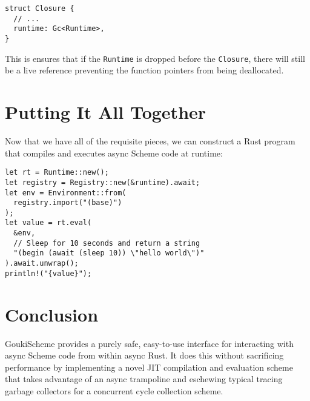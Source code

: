 \documentclass[sigplan,authordraft]{acmart}
\begin{document}
\begin{verbatim}
struct Closure {
  // ...
  runtime: Gc<Runtime>,
}
\end{verbatim}

This is ensures that if the \texttt{Runtime} is dropped before the
\texttt{Closure}, there will still be a live reference preventing the function
pointers from being deallocated.

\section{Putting It All Together}

Now that we have all of the requisite pieces, we can construct a Rust program
that compiles and executes async Scheme code at runtime:

\begin{verbatim}
let rt = Runtime::new();
let registry = Registry::new(&runtime).await;
let env = Environment::from(
  registry.import("(base)")
);
let value = rt.eval(
  &env,
  // Sleep for 10 seconds and return a string
  "(begin (await (sleep 10)) \"hello world\")"
).await.unwrap();
println!("{value}");
\end{verbatim}

\section{Conclusion}

GoukiScheme provides a purely safe, easy-to-use interface for interacting with
async Scheme code from within async Rust. It does this without sacrificing
performance by implementing a novel JIT compilation and evaluation scheme
that takes advantage of an async trampoline and eschewing typical tracing
garbage collectors for a concurrent cycle collection scheme. 



\end{document}
